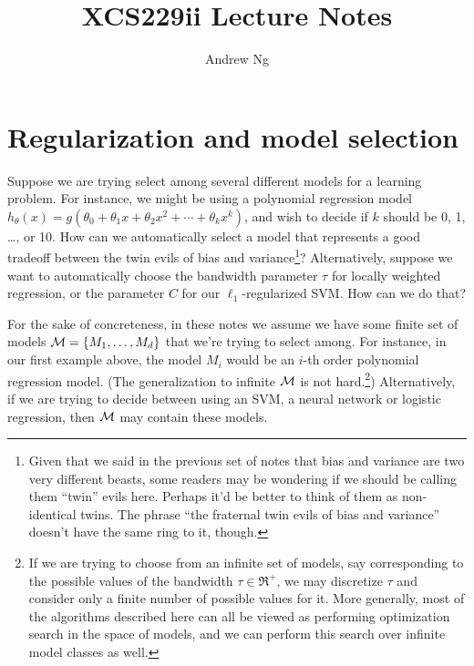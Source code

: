 \documentclass{article}
\begin{document}
\title{XCS229ii Lecture Notes}
\author{Andrew Ng}
\date{}
\maketitle


\noindent


\setcounter{part}{5}
\part{Regularization and model selection}


Suppose we are trying select among several different models
for a learning problem.  For instance, we might be using a polynomial
regression model 
$h_\theta(x) = g(\theta_0 + \theta_1 x + \theta_2 x^2 + \cdots + \theta_k x^k)$,
and wish to decide if $k$ should be 0, 1, \dots, or 10.  
How can we automatically select a
model that represents a good tradeoff 
between the twin evils of bias and variance\footnote{Given that we
said in the previous set of notes that bias and variance are two very different 
beasts, some readers may be wondering if we should be calling them ``twin'' 
evils here.  Perhaps it'd be better to think of them as non-identical twins. 
The phrase ``the fraternal twin evils of bias and variance'' doesn't have 
the same ring to it, though.}?
Alternatively, suppose we want to 
automatically choose the bandwidth parameter $\tau$ for locally weighted regression, 
or the parameter $C$ for our $\ell_1$-regularized SVM.  How can we 
do that?

For the sake of concreteness, in these notes we assume we
have some finite set of models ${\cal M} = \{M_1, \ldots, M_d\}$
that we're trying to select among.  For instance, in our first
example above, the model $M_i$ would be an 
$i$-th order polynomial regression model.
(The generalization to infinite ${\cal M}$ is not 
hard.\footnote{If we are trying to choose from an infinite set of models, say 
corresponding to the possible values of the bandwidth $\tau \in \Re^+$, we 
may discretize $\tau$ and consider only a finite number 
of possible values for it.  More generally, most of the algorithms described here 
can all be viewed as performing optimization search in the space
of models, and we can perform this search over infinite model
classes as well.}) 
Alternatively, if we are trying to decide between using an SVM,
a neural network or logistic regression, then ${\cal M}$ may 
contain these models. 
\end{document}
